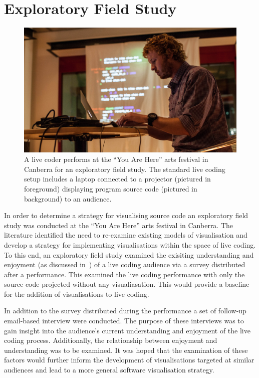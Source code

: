 
\chapter{Exploratory Field Study}
\label{chap:exploratory-field-study}

\begin{figure}
\centering
\includegraphics[width=1.0\textwidth]{../images/study-1-you-are-here-ben.jpg}
\caption[Standard live coding setup]{A live coder performs at the ``You Are Here'' arts festival in Canberra for an exploratory field study. The standard live coding setup includes a laptop connected to a projector (pictured in foreground) displaying program source code (pictured in background) to an audience.}
\label{fig:exploratory-field-study-ben}
\end{figure}


In order to determine a strategy for visualising source code an exploratory field study was conducted at the ``You Are Here'' arts festival in Canberra. The literature identified the need to re-examine existing models of visualisation and develop a strategy for implementing visualisations within the space of live coding. To this end, an exploratory field study examined the exisiting understanding and enjoyment (as discussed in~\cite{McLean2010a}) of a live coding audience via a survey distributed after a performance. This examined the live coding performance with only the source code projected without any visualiasation. This would provide a baseline for the addition of visualisations to live coding.

In addition to the survey distributed during the performance a set of follow-up email-based interview were conducted. The purpose of these interviews was to gain insight into the audience's current understanding and enjoyment of the live coding process. Additionally, the relationship between enjoyment and understanding was to be examined. It was hoped that the examination of these factors would further inform the development of visualisations targeted at similar audiences and lead to a more general software visualisation strategy.

